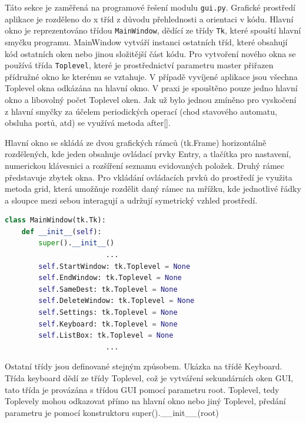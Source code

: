 Táto sekce je zaměřená na programové řešení modulu \texttt{gui.py}. Grafické prostředí aplikace je rozděleno do x tříd z důvodu přehlednosti a orientaci v kódu. Hlavní okno je reprezentováno třídou \texttt{MainWindow}, dědící ze třídy \texttt{Tk}, které spouští hlavní smyčku programu. MainWindow vytváří instanci ostatních tříd, které obsahují kód ostatních oken nebo jinou složitější část kódu. Pro vytvoření nového okna se používá třída \texttt{Toplevel}, které je prostřednictví parametru master přiřazen přídružné okno ke kterému se vztahuje. V případě vyvíjené aplikace jsou všechna Toplevel okna odkázána na hlavní okno. V praxi je spouštěno pouze jedno hlavní okno a libovolný počet Toplevel oken. Jak už bylo jednou zmíněno pro vyskočení z hlavní smyčky za účelem periodických operací (chod stavového automatu, obsluha portů, atd) se využívá metoda after[].

Hlavní okno se skládá ze dvou grafických rámců (tk.Frame) horizontálně rozdělených, kde jeden obsahuje ovládací prvky Entry, a tlačítka pro nastavení, numerickou klávesnici a rozšíření seznamu evidovaných položek. Druhý rámec představuje zbytek okna. Pro vkládání ovládacích prvků do prostředí je využita metoda grid, která umožňuje rozdělit daný rámec na mřížku, kde jednotlivé řádky a sloupce mezi sebou interagují a udržují symetrický vzhled prostředí.



\begin{lstlisting}[language=Python, caption=Funkce stavového automatu, frame=single, breaklines=false]
class MainWindow(tk.Tk):
    def __init__(self):
        super().__init__()
                        ...                       
        self.StartWindow: tk.Toplevel = None
        self.EndWindow: tk.Toplevel = None
        self.SameDest: tk.Toplevel = None
        self.DeleteWindow: tk.Toplevel = None
        self.Settings: tk.Toplevel = None
        self.Keyboard: tk.Toplevel = None
        self.ListBox: tk.Toplevel = None
                        ...
\end{lstlisting}

Ostatní třídy jsou definované stejným způsobem. Ukázka na třídě Keyboard. Třída keyboard dědí ze třídy Toplevel, což je vytváření sekundárních oken GUI, tato třída je provázána s třídou GUI pomocí parametru root. Toplevel, tedy Toplevely mohou odkazovat přímo na hlavní okno nebo jiný Toplevel, předání parametru je pomocí konstruktoru super().\_\_init\_\_(root)

%
%        


